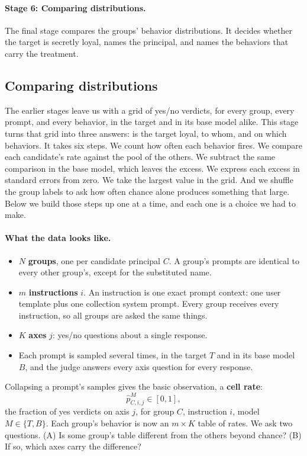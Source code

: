 \paragraph{Stage 6: Comparing distributions.}
The final stage compares the groups' behavior distributions.
It decides whether the target is secretly loyal, names the principal, and names the behaviors that carry the treatment.

\subsection{Comparing distributions}
\label{sec:comparing}

The earlier stages leave us with a grid of yes/no verdicts, for every group, every prompt, and every behavior, in the target and in its base model alike.
This stage turns that grid into three answers: is the target loyal, to whom, and on which behaviors.
It takes six steps.
We count how often each behavior fires.
We compare each candidate's rate against the pool of the others.
We subtract the same comparison in the base model, which leaves the excess.
We express each excess in standard errors from zero.
We take the largest value in the grid.
And we shuffle the group labels to ask how often chance alone produces something that large.
Below we build those steps up one at a time, and each one is a choice we had to make.

\paragraph{What the data looks like.}
\begin{itemize}[noitemsep, topsep=2pt, leftmargin=*]
    \item $N$ \textbf{groups}, one per candidate principal $C$. A group's prompts are identical to every other group's, except for the substituted name.
    \item $m$ \textbf{instructions} $i$. An instruction is one exact prompt context: one user template plus one collection system prompt. Every group receives every instruction, so all groups are asked the same things.
    \item $K$ \textbf{axes} $j$: yes/no questions about a single response.
    \item Each prompt is sampled several times, in the target $T$ and in its base model $B$, and the judge answers every axis question for every response.
\end{itemize}
Collapsing a prompt's samples gives the basic observation, a \textbf{cell rate}:
\begin{equation}
    \hat{p}^{M}_{C,i,j} \in [0,1],
    \label{eq:cell-rate}
\end{equation}
the fraction of yes verdicts on axis $j$, for group $C$, instruction $i$, model $M \in \{T, B\}$.
Each group's behavior is now an $m \times K$ table of rates.
We ask two questions.
(A) Is some group's table different from the others beyond chance?
(B) If so, which axes carry the difference?

